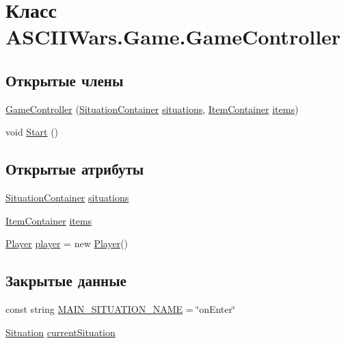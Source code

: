 \hypertarget{class_a_s_c_i_i_wars_1_1_game_1_1_game_controller}{}\section{Класс A\+S\+C\+I\+I\+Wars.\+Game.\+Game\+Controller}
\label{class_a_s_c_i_i_wars_1_1_game_1_1_game_controller}
\subsection*{Открытые члены}
\begin{DoxyCompactItemize}
\item 
\hyperlink{class_a_s_c_i_i_wars_1_1_game_1_1_game_controller_a9a4ad508f104af513b81824b784b0bb0}{Game\+Controller} (\hyperlink{class_a_s_c_i_i_wars_1_1_game_1_1_situation_container}{Situation\+Container} \hyperlink{class_a_s_c_i_i_wars_1_1_game_1_1_game_controller_aaab40310e11bd03711896ec5685ebe10}{situations}, \hyperlink{class_a_s_c_i_i_wars_1_1_game_1_1_item_container}{Item\+Container} \hyperlink{class_a_s_c_i_i_wars_1_1_game_1_1_game_controller_a96ab06ced4cf725ad1a4200425a533eb}{items})
\item 
void \hyperlink{class_a_s_c_i_i_wars_1_1_game_1_1_game_controller_a6a70e650d0140338ebd053c56cd55496}{Start} ()
\end{DoxyCompactItemize}
\subsection*{Открытые атрибуты}
\begin{DoxyCompactItemize}
\item 
\hyperlink{class_a_s_c_i_i_wars_1_1_game_1_1_situation_container}{Situation\+Container} \hyperlink{class_a_s_c_i_i_wars_1_1_game_1_1_game_controller_aaab40310e11bd03711896ec5685ebe10}{situations}
\item 
\hyperlink{class_a_s_c_i_i_wars_1_1_game_1_1_item_container}{Item\+Container} \hyperlink{class_a_s_c_i_i_wars_1_1_game_1_1_game_controller_a96ab06ced4cf725ad1a4200425a533eb}{items}
\item 
\hyperlink{class_a_s_c_i_i_wars_1_1_game_1_1_player}{Player} \hyperlink{class_a_s_c_i_i_wars_1_1_game_1_1_game_controller_a16a24596b98a17361e430d984f85a7ca}{player} = new \hyperlink{class_a_s_c_i_i_wars_1_1_game_1_1_player}{Player}()
\end{DoxyCompactItemize}
\subsection*{Закрытые данные}
\begin{DoxyCompactItemize}
\item 
const string \hyperlink{class_a_s_c_i_i_wars_1_1_game_1_1_game_controller_a14c3ad1eaf01d8c03789d8cc1fd09dde}{M\+A\+I\+N\+\_\+\+S\+I\+T\+U\+A\+T\+I\+O\+N\+\_\+\+N\+A\+ME} = \char`\"{}on\+Enter\char`\"{}
\item 
\hyperlink{class_a_s_c_i_i_wars_1_1_game_1_1_situation}{Situation} \hyperlink{class_a_s_c_i_i_wars_1_1_game_1_1_game_controller_ac62620afe49df42fd9f835da53e11a8b}{current\+Situation}
\end{DoxyCompactItemize}


